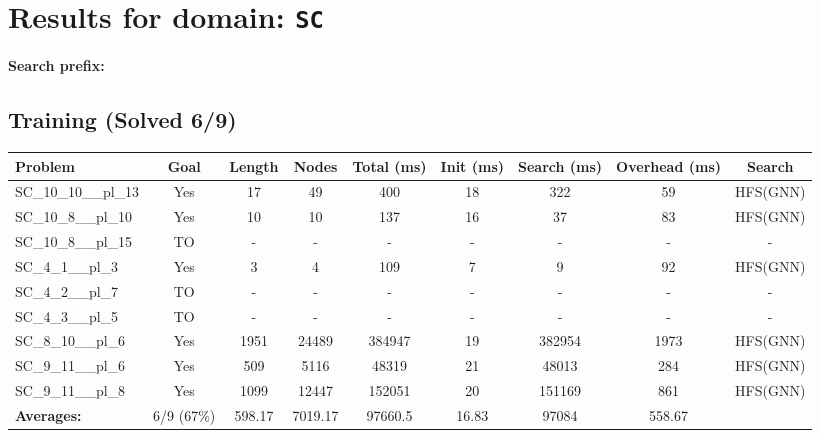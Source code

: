 \documentclass{article}
\begin{document}
\section*{Results for domain: \texttt{SC}}
\textbf{Search prefix:} 
\\[0.5cm]
\subsection*{Training (Solved 6/9)}
\begin{tabular}{lcccccccc}
\toprule
Problem & Goal & Length & Nodes & Total (ms) & Init (ms) & Search (ms) & Overhead (ms) & Search \\
\midrule
SC\_10\_10\_\_pl\_13 & Yes & 17 & 49 & 400 & 18 & 322 & 59 & HFS(GNN) \\
SC\_10\_8\_\_pl\_10 & Yes & 10 & 10 & 137 & 16 & 37 & 83 & HFS(GNN) \\
SC\_10\_8\_\_pl\_15 & TO & - & - & - & - & - & - & - \\
SC\_4\_1\_\_pl\_3 & Yes & 3 & 4 & 109 & 7 & 9 & 92 & HFS(GNN) \\
SC\_4\_2\_\_pl\_7 & TO & - & - & - & - & - & - & - \\
SC\_4\_3\_\_pl\_5 & TO & - & - & - & - & - & - & - \\
SC\_8\_10\_\_pl\_6 & Yes & 1951 & 24489 & 384947 & 19 & 382954 & 1973 & HFS(GNN) \\
SC\_9\_11\_\_pl\_6 & Yes & 509 & 5116 & 48319 & 21 & 48013 & 284 & HFS(GNN) \\
SC\_9\_11\_\_pl\_8 & Yes & 1099 & 12447 & 152051 & 20 & 151169 & 861 & HFS(GNN) \\
\textbf{Averages:} & 6/9 (67\%) & 598.17 & 7019.17 & 97660.5 & 16.83 & 97084 & 558.67 & \\
\bottomrule
\end{tabular}
\\[0.7cm]
\end{document}
